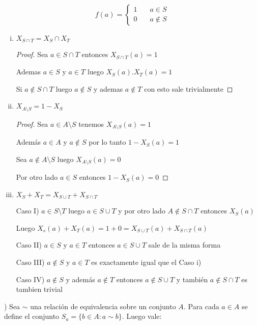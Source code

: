 \documentclass[12pt]{article}
\theoremstyle{definition}
\begin{document}
$$
f(a) = \left\{
        \begin{array}{ll}
            1 & \quad a \in S \\
            0 & \quad a \notin S
        \end{array}
    \right.
$$
\begin{enumerate}[i.]
  
  \item $X_{S \cap T} = X_{S} \cap X_{T} $
    \begin{proof}
      Sea $a \in S \cap T$ entonces $X_{S \cap T}(a) = 1$

      Ademas $a \in S$ y $a \in T$ luego $X_{S}(a).X_{T}(a) = 1$

      Si $a \notin S \cap T$ luego $a \notin S$ y ademas $a \notin T$ con esto sale trivialmente
    \end{proof}

  \item $X_{A \setminus S} = 1 - X_{S}$
    \begin{proof}
      Sea $a \in A \setminus S$ tenemos $X_{A \setminus S}(a) = 1$

      Además $a \in A$ y $a \notin S$ por lo tanto $1 - X_{S}(a) = 1$

      Sea $a \notin A \setminus S$ luego $X_{A \setminus S}(a) = 0$

      Por otro lado $a \in S$ entonces $1 - X_{S}(a) = 0$
    \end{proof}

  \item $X_{S} + X_{T} = X_{S \cup T} + X_{S \cap T}$ 

    Caso I) $a \in S \setminus T$ luego $a \in S \cup T$ y por otro lado $A \notin S \cap T $ entonces $X_{S}(a) $

    Luego $X_{s}(a) + X_{T}(a) = 1 + 0 = X_{S \cup T}(a) + X_{S \cap T}(a)$

    Caso II)  $a \in S $ y $a \in T$ entonces $a \in S \cup T$ sale de la misma forma
    
    Caso III) $a \notin S$ y $a \in T$ es exactamente igual que el Caso i)
    
    Caso IV) $a \notin S$ y además $a \notin T$ entonces $a \notin S \cup T$ y también $a \notin S \cap T$ es tambien trivial
\end{enumerate}
) Sea $\sim$ una relación de equivalencia sobre un conjunto $A$. Para cada $a \in A$ se define el conjunto $S_{a} = \{b \in A : a \sim b\}$. Luego vale:
\end{document}
